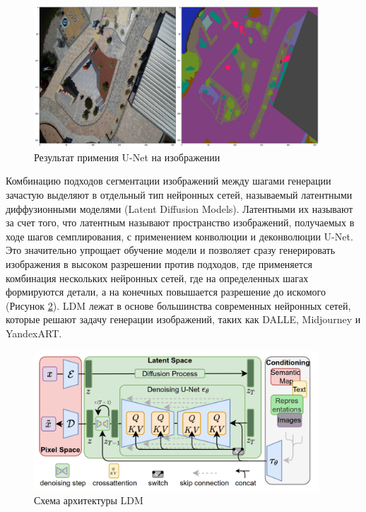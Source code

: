 \begin{figure}[H]
  \centering
  \includegraphics[width=0.95\textwidth]{img/conv.png}
  \caption{Результат примения U-Net на изображении}
    \label{fig:conv}
\end{figure}

Комбинацию подходов сегментации изображений между шагами генерации зачастую выделяют в отдельный тип нейронных сетей, называемый
латентными диффузионными моделями (Latent Diffusion Models). Латентными их называют за счет того, что латентным называют пространство
изображений, получаемых в ходе шагов семплирования, с применением конволюции и деконволюции U-Net. Это значительно
упрощает обучение модели и позволяет сразу генерировать изображения в высоком разрешении против подходов, где применяется
комбинация нескольких нейронных сетей, где на определенных шагах формируются детали, а на конечных повышается разрешение
до искомого (Рисунок \ref{fig:latent}).
LDM лежат в основе большинства современных нейронных сетей,
которые решают задачу генерации изображений, таких как DALLE, Midjourney и YandexART.
\begin{figure}[H]
  \centering
  \includegraphics[width=0.95\textwidth]{img/latent.png}
  \caption{Схема архитектуры LDM\cite{rombach2022high}}
    \label{fig:latent}
\end{figure}

